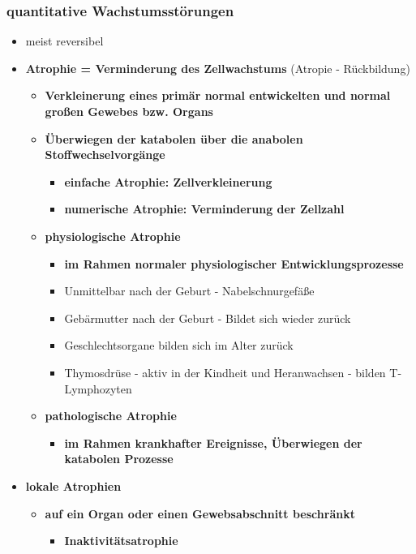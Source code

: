 \subsubsection{quantitative Wachstumsstörungen}
	\begin{itemize}
		\item meist reversibel
		\item \textbf{Atrophie = Verminderung des Zellwachstums} (Atropie - Rückbildung)
			\begin{itemize}
				\item \textbf{Verkleinerung eines primär normal entwickelten und normal großen Gewebes bzw. Organs}
				\item \textbf{Überwiegen der katabolen über die anabolen Stoffwechselvorgänge}
					\begin{itemize}
						\item \textbf{einfache Atrophie: Zellverkleinerung}
						\item \textbf{numerische Atrophie: Verminderung der Zellzahl}
					\end{itemize}
				\item \textbf{physiologische Atrophie}
					\begin{itemize}
						\item \textbf{im Rahmen normaler physiologischer Entwicklungsprozesse}
						\item Unmittelbar nach der Geburt - Nabelschnurgefäße
						\item Gebärmutter nach der Geburt - Bildet sich wieder zurück
						\item Geschlechtsorgane bilden sich im Alter zurück
						\item Thymosdrüse - aktiv in der Kindheit und Heranwachsen - bilden T-Lymphozyten
					\end{itemize}
				\item \textbf{pathologische Atrophie}
					\begin{itemize}
						\item \textbf{im Rahmen krankhafter Ereignisse, Überwiegen der katabolen Prozesse}
					\end{itemize}
			\end{itemize}
		\item \textbf{lokale Atrophien}
			\begin{itemize}
				\item \textbf{auf ein Organ oder einen Gewebsabschnitt beschränkt}
					\begin{itemize}
						\item \textbf{Inaktivitätsatrophie}

\end{itemize}
\end{itemize}
\end{itemize}
